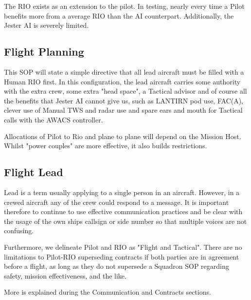 The RIO exists as an extension to the pilot. In testing, nearly every time a
Pilot benefits more from a average RIO than the AI counterpart. Additionally,
the Jester AI is severely limited.

\subsection*{Flight Planning}

This SOP will state a simple directive that all lead aircraft must be filled
with a Human RIO first. In this configuration, the lead aircraft carries some
authority with the extra crew, some extra "head space", a Tactical advisor and
of course all the benefits that Jester AI cannot give us, such as LANTIRN pod
use, FAC(A), clever use of Manual TWS and radar use and spare ears and mouth
for Tactical calls with the AWACS controller.

Allocations of Pilot to Rio and plane to plane will depend on the Mission Host.
Whilst "power couples" are more effective, it also builds restrictions.

\subsection*{Flight Lead}

Lead is a term usually applying to a single person in an aircraft. However, in
a crewed aircraft any of the crew could respond to a message. It is important
therefore to continue to use effective communication practices and be clear
with the usage of the own ships callsign or side number so that multiple voices
are not confusing.

Furthermore, we delineate Pilot and RIO as "Flight and Tactical". There are no
limitations to Pilot-RIO superseding contracts if both parties are in agreement
before a flight, as long as they do not supersede a Squadron SOP regarding
safety, mission effectiveness, and the like.

More is explained during the Communication and Contracts sections.
